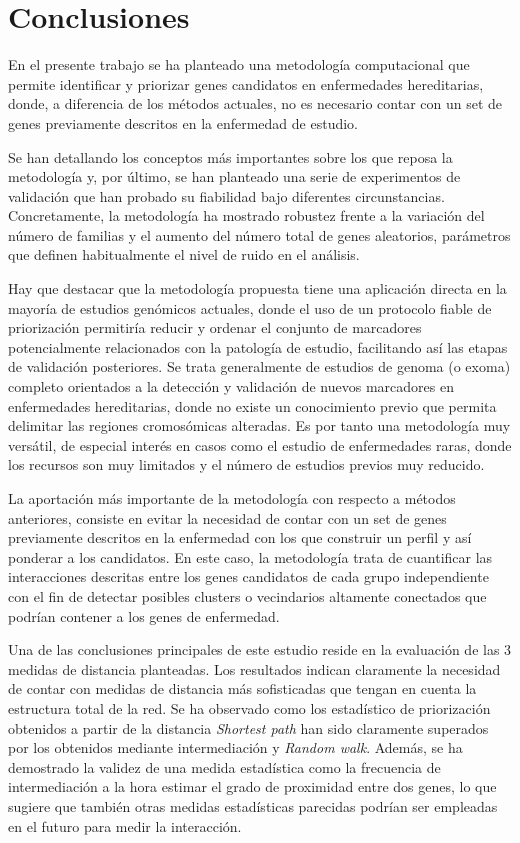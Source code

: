 \chapter{Conclusiones}

En el presente trabajo se ha planteado una metodología computacional que permite identificar y priorizar genes candidatos en enfermedades hereditarias, donde, a diferencia de los métodos actuales, no es necesario contar con un set de genes previamente descritos en la enfermedad de estudio.

\medskip
Se han detallando los conceptos más importantes sobre los que reposa la metodología y, por último, se han planteado una serie de experimentos de validación que han probado su fiabilidad bajo diferentes circunstancias. Concretamente, la metodología ha mostrado robustez frente a la variación del número de familias y el aumento del número total de genes aleatorios, parámetros que definen habitualmente el nivel de ruido en el análisis.

\medskip
Hay que destacar que la metodología propuesta tiene una aplicación directa en la mayoría de estudios genómicos actuales, donde el uso de un protocolo fiable de priorización permitiría reducir y ordenar el conjunto de marcadores potencialmente relacionados con la patología de estudio, facilitando así las etapas de validación posteriores. Se trata generalmente de estudios de genoma (o exoma) completo orientados a la detección y validación de nuevos marcadores en enfermedades hereditarias, donde no existe un conocimiento previo que permita delimitar las regiones cromosómicas alteradas. Es por tanto una metodología muy versátil, de especial interés en casos como el estudio de enfermedades raras, donde los recursos son muy limitados y el número de estudios previos muy reducido.

\medskip
La aportación más importante de la metodología con respecto a métodos anteriores, consiste en evitar la necesidad de contar con un set de genes previamente descritos en la enfermedad con los que construir un perfil y así ponderar a los candidatos. En este caso, la metodología trata de cuantificar las interacciones descritas entre los genes candidatos de cada grupo independiente con el fin de detectar posibles clusters o vecindarios altamente conectados que podrían contener a los genes de enfermedad. 

\medskip
Una de las conclusiones principales de este estudio reside en la evaluación de las 3 medidas de distancia planteadas. Los resultados indican claramente la necesidad de contar con medidas de distancia más sofisticadas que tengan en cuenta la estructura total de la red. Se ha observado como los estadístico de priorización obtenidos a partir de la distancia \emph{Shortest path} han sido claramente superados por los obtenidos mediante intermediación y \emph{Random walk}. Además, se ha demostrado la validez de una medida estadística como la frecuencia de intermediación a la hora estimar el grado de proximidad entre dos genes, lo que sugiere que también otras medidas estadísticas parecidas podrían ser empleadas en el futuro para medir la interacción.

